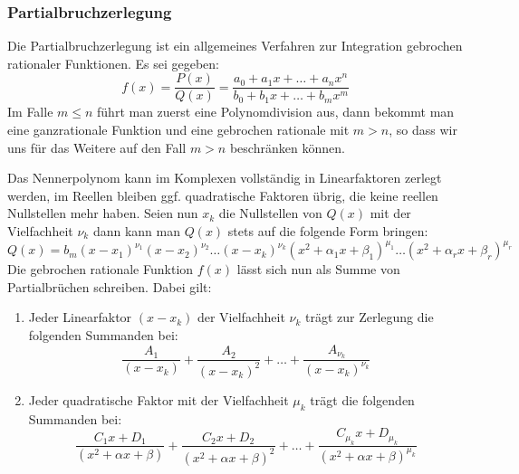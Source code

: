 \subsubsection{Partialbruchzerlegung}
Die Partialbruchzerlegung ist ein allgemeines Verfahren zur Integration
gebrochen rationaler Funktionen. Es sei gegeben:
\begin{equation}
  \label{eq:68}
  f(x)=\frac{P(x)}{Q(x)}
  =\frac{a_0+a_1x+\dots+a_nx^n}{b_0+b_1x+\dots+b_mx^m}
\end{equation}
Im Falle $m\le n$ führt man zuerst eine Polynomdivision aus, dann bekommt man
eine ganzrationale Funktion und eine gebrochen rationale mit $m>n$, so dass
wir uns für das Weitere auf den Fall $m>n$ beschränken können.

Das Nennerpolynom kann im Komplexen vollständig in Linearfaktoren zerlegt
werden, im Reellen bleiben ggf. quadratische Faktoren übrig, die keine reellen
Nullstellen mehr haben. Seien nun $x_k$ die Nullstellen von $Q(x)$ mit der
Vielfachheit $\nu_k$ dann kann man $Q(x)$ stets auf die folgende Form bringen:
\begin{equation}
  \label{eq:69}
  Q(x)=b_m(x-x_1)^{\nu_1}(x-x_2)^{\nu_2}\dots(x-x_k)^{\nu_k}
  (x^2+\alpha_1x+\beta_1)^{\mu_1}\dots(x^2+\alpha_rx+\beta_r)^{\mu_r}
\end{equation}
Die gebrochen rationale Funktion $f(x)$ lässt sich nun als Summe von
Partialbrüchen schreiben. Dabei gilt:
\begin{enumerate}
\item Jeder Linearfaktor $(x-x_k)$ der Vielfachheit $\nu_k$ trägt zur
  Zerlegung die folgenden Summanden bei:
  \[
  \frac{A_1}{(x-x_k)}+\frac{A_2}{(x-x_k)^2}+\dots
  +\frac{A_{\nu_k}}{(x-x_k)^{\nu_k}}
  \]
\item Jeder quadratische Faktor mit der Vielfachheit $\mu_k$ trägt die
  folgenden Summanden bei:
  \[
  \frac{C_1x+D_1}{(x^2+\alpha x+\beta)}+
  \frac{C_2x+D_2}{(x^2+\alpha x+\beta)^2}+\dots+
  \frac{C_{\mu_k}x+D_{\mu_k}}{(x^2+\alpha x+\beta)^{\mu_k}}
  \]
\end{enumerate}


